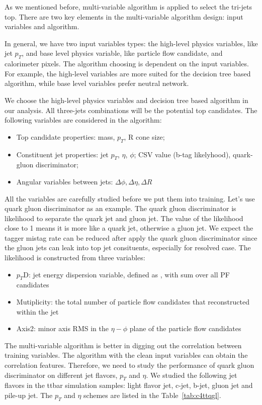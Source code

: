 As we mentioned before, multi-variable algorithm is applied to select the tri-jets top. There are two key elements in the multi-variable algorithm design: input variables and algorithm. 

In general, we have two input variables types: the high-level physics variables, like jet $p_{T}$, and base level physics variable, like particle flow candidate, and calorimeter pixels. The algorithm choosing is dependent on the input variables. For example, the high-level variables are more suited for the decision tree based algorithm, while base level variables prefer neutral network. 

We choose the high-level physics variables and decision tree based algorithm in our analysis. All three-jets combinations will be the potential top candidates. The following variables are considered in the algorithm: 
\begin{itemize}
\item Top candidate properties: mass, $p_{T}$, R cone size;
\item Constituent jet properties: jet $p_{T}$, $\eta$, $\phi$; CSV value (b-tag likelyhood), quark-gluon discriminator;
\item Angular variables between jets: $\Delta \phi, \Delta \eta, \Delta R$
\end{itemize}

All the variables are carefully studied before we put them into training. Let’s use quark gluon discriminator as an example. The quark gluon discriminator is likelihood to separate the quark jet and gluon jet. The value of the likelihood close to 1 means it is more like a quark jet, otherwise a gluon jet. We expect the tagger mistag rate can be reduced after apply the quark gluon discriminator since the gluon jets can leak into top jet consituents, especially for resolved case. The likelihood is constructed from three variables: 
\begin{itemize}
\item $p_{T}$D: jet energy dispersion variable, defined as $ $, with sum over all PF candidates
\item Mutiplicity: the total number of particle flow candidates that reconstructed within the jet
\item Axis2: minor axis RMS in the $\eta - \phi$ plane of the particle flow candidates
\end{itemize}

The multi-variable algorithm is better in digging out the correlation between training variables. The algorithm with the clean input variables can obtain the correlation features. Therefore, we need to study the performance of quark gluon discriminator on different jet flavors, $p_{T}$ and $\eta$. We studied the following jet flavors in the ttbar simulation samples: light flavor jet, c-jet, b-jet, gluon jet and pile-up jet. The $p_{T}$ and $\eta$ schemes are listed in the Table~\ref{tab:c4ttqgl}.

